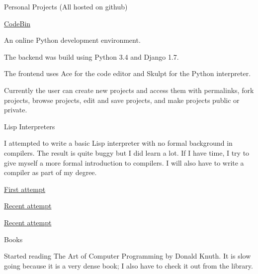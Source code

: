 \documentclass{resume} %
\begin{document}
\begin{rSection}{Personal Projects (All hosted on github)}

\begin{rSubsection}{\href{https://github.com/dcjohnson/CodeBin}{CodeBin}}{}{}{}
	\item An online Python development environment.
	\item The backend was build using Python 3.4 and Django 1.7.
	\item The frontend uses Ace for the code editor and Skulpt for the Python interpreter.
	\item Currently the user can create new projects and access them with permalinks, fork projects, browse projects, edit and save projects, and make projects public or private.
\end{rSubsection}

\begin{rSubsection}{Lisp Interpreters}{}{}{}
	\item I attempted to write a basic Lisp interpreter with no formal background in compilers. The result is quite buggy but I did learn a lot. If I have time, I try to give myself a more formal introduction to compilers. I will also have to write a compiler as part of my degree.
	\item {\href{https://github.com/dcjohnson/hackit}{First attempt}}
	\item {\href{https://github.com/dcjohnson/hackit-v2}{Recent attempt}}
	\item {\href{https://github.com/dcjohnson/libhackit-v2}{Recent attempt}}
\end{rSubsection}

\begin{rSubsection}{Books}{}{}{}
	\item Started reading The Art of Computer Programming by Donald Knuth. It is slow going because it is a very dense book; I also have to check it out from the library.
\end{rSubsection}

\end{rSection}

\end{document}
